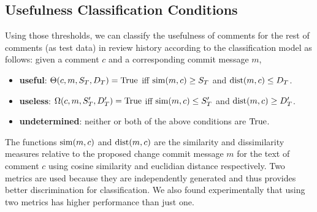 \subsection{Usefulness Classification Conditions} 
Using those thresholds, we can classify the usefulness of comments for the rest of comments (as test data) in review history according to the classification model as follows: given a comment $c$ and a corresponding commit message $m$,
\begin{itemize}
\item \textbf{useful}: $\Theta(c,m,S_T,D_T) = \operatorname{True}$ iff $\operatorname{sim}(m,c) \geq S_T$ and $\operatorname{dist}(m,c) \leq D_T$.
\item \textbf{useless}: $\Omega(c,m,S'_T,D'_T) = \operatorname{True}$ iff $\operatorname{sim}(m,c) \leq  S'_T$ and $\operatorname{dist}(m,c) \geq D'_T$.
\item \textbf{undetermined}: neither or both of the above conditions are $\operatorname{True}$.
\end{itemize}

The functions $\operatorname{sim}(m,c)$ and $\operatorname{dist}(m,c)$ are the similarity and dissimilarity measures relative to the proposed change commit message $m$ for the text of comment $c$ using cosine similarity and euclidian distance respectively.
Two metrics are used because they are independently generated and thus provides better discrimination for classification.
We also found experimentally that using two metrics has higher performance than just one. 


